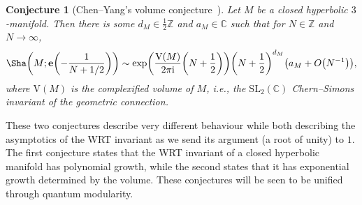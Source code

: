\documentclass[pdftex]{sigma}
\numberwithin{equation}{section}
\newtheorem{Conjecture}[Theorem]{Conjecture}
\def\BZ{\mathbb{Z}}
\def\BC{\mathbb{C}}
\def\SL{\mathrm{SL}}
\def\e{\mathbf e}
\def\VC{\mathrm{VC}}
\def\SL{\mathrm{SL}}
\def\WRT{\Sha}
\def\BZ{\mathbb Z}
\def\BC{\mathbb C}
\def\SL{\mathrm{SL}}
\def\VC{\mathrm{V}}
\begin{document}
\begin{Conjecture}[Chen--Yang's volume conjecture~\cite{ChenYang}]%
Let $M$ be a closed hyperbolic $3$-manifold. Then there is some $d_M\in\frac{1}{2}\BZ$ and $a_M\in\BC$ such that for $N\in\BZ$ and $N\rightarrow\infty$,
\[
 \WRT\biggl(M;\e\biggl(-\frac{1}{N+1/2}\biggr)\biggr)
 \sim
 \exp\biggl(\frac{\VC(M)}{2\pi {\rm i}}\biggl(N+\frac{1}{2}\biggr)\biggr)\biggl(N+\frac{1}{2}\biggr)^{d_M}\bigl(a_M+O\bigl(N^{-1}\bigr)\bigr) ,
\]
where $\VC(M)$ is the complexified volume of $M$, i.e., the $\SL_2(\BC)$ Chern--Simons invariant of the geometric connection.
\end{Conjecture}
These two conjectures describe very different behaviour while both describing the asymptotics of the WRT invariant as we send its argument (a root of unity) to $1$. The first conjecture states that the WRT invariant of a closed hyperbolic manifold has polynomial growth, while the second states that it has exponential growth determined by the volume. These conjectures will be seen to be unified through quantum modularity.
\end{document}
